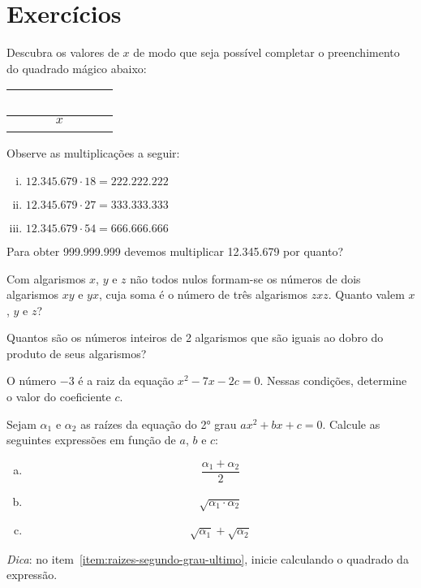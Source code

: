 \section{Exercícios}

\begin{exercise}
Descubra os valores de $x$ de modo que seja possível completar
o preenchimento do quadrado mágico abaixo:
\begin{center}
\begin{tabular}{|c|c|c|}
  \hline
   \ \ \  & \ \ \  & \ \ \  \\ \hline
          & $x$    &        \\ \hline
          &        &        \\
  \hline
\end{tabular}
\end{center}
\end{exercise}

\begin{exercise}
Observe as multiplicações a seguir:
\begin{enumerate}[i.]
  \item $12.345.679 \cdot 18 = 222.222.222$
  \item $12.345.679 \cdot 27 = 333.333.333$
  \item $12.345.679 \cdot 54 = 666.666.666$
\end{enumerate}
Para obter 999.999.999 devemos multiplicar 12.345.679 por quanto?
\end{exercise}

\begin{exercise}
Com algarismos $x$, $y$ e $z$ não todos nulos formam-se os
números de dois algarismos $xy$ e $yx$, cuja soma é o número de três
algarismos $zxz$. Quanto valem $x$, $y$ e $z$?
\end{exercise}

\begin{exercise}
Quantos são os números inteiros de 2 algarismos que são iguais
ao dobro do produto de seus algarismos?
\end{exercise}


\begin{exercise}
O número $-3$ é a raiz da equação $x^2 -7x -2c = 0$. Nessas
condições, determine o valor do coeficiente $c$.
\end{exercise}

\begin{exercise}
  Sejam $\alpha_1$ e $\alpha_2$ as raízes da equação do 2° grau $ax^2+bx+c=0$. Calcule
  as seguintes expressões em função de $a$, $b$ e $c$:
  \begin{enumerate}[a)]
    \item \[\frac{\alpha_1+\alpha_2}{2}\]
    \item \[\sqrt{\alpha_1\cdot\alpha_2}\]
    \item \label{item:raizes-segundo-grau-ultimo} \[\sqrt{\alpha_1}+\sqrt{\alpha_2}\]
  \end{enumerate}
  \textit{Dica}: no item~\ref{item:raizes-segundo-grau-ultimo}, inicie calculando o 
  quadrado da expressão.
\end{exercise}

